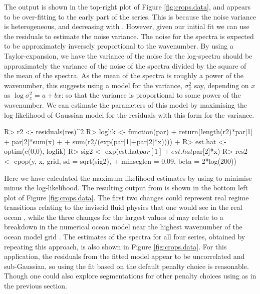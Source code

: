 \documentclass[article]{jss}
\begin{document}
The output is shown in the top-right plot of Figure \ref{fig:crops.data}, and appears to be over-fitting to the early part of the series. This is because the noise variance is heterogeneous, and decreasing with . However, given our initial fit we can use the residuals to estimate the noise variance. The noise for the spectra is expected to be approximately inversely proportional to the wavenumber. By using a Taylor-expansion, we have the variance of the noise for the log-spectra should be approximately the variance of the noise of the spectra divided by the square of the mean of the spectra. As the mean of the spectra is roughly a power of the wavenumber, this suggests using a model for the variance, $\sigma^2_x$ say, depending on $x$ as $\log \sigma^2_x = a + bx$: so that the variance is proportional to some power of the wavenumber. We can estimate the parameters of this model by maximising the log-likelihood of Gaussian model for the residuals with this form for the variance.
\newpage
\begin{CodeChunk}
\begin{CodeInput}
R> r2 <- residuals(res)^2
R> loglik <- function(par) { 
+  return(length(r2)*par[1] + par[2]*sum(x) + 
+          sum(r2/(exp(par[1]+par[2]*x))))
+ }
R> est.hat <- optim(c(0,0), loglik)
R> sig2 <- exp(est.hat$par[1] + est.hat$par[2]*x)
R> res2 <- cpop(y, x, grid, sd = sqrt(sig2), 
+               minseglen = 0.09, beta = 2*log(200))
\end{CodeInput}
\end{CodeChunk}
Here we have calculated the maximum likelihood estimates by using  to minimise minus the log-likelihood. The resulting output from  is shown in the bottom left plot of Figure \ref{fig:crops.data}.  The first two changes could represent real regime transitions relating to the inviscid fluid physics that one would see in the real ocean \cite[see Figure 6a of][]{callies2013interpreting}, while the three changes for the largest values of  may relate to a breakdown in the numerical ocean model near the highest wavenumber of the ocean model grid \cite[]{soufflet2016effective}. The estimates of the spectra for all four series, obtained by repeating this approach, is also shown in Figure \ref{fig:crops.data}. For this application, the residuals from the fitted model appear to be uncorrelated and sub-Gaussian, so using the fit based on the default penalty choice is reasonable. Though one could also explore segmentations for other penalty choices using  as in the previous section.
\end{document}
